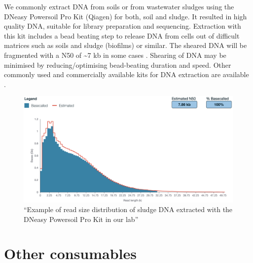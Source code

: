 \documentclass[
]{book}
\begin{document}
We commonly extract DNA from soils or from wastewater sludges using the DNeasy Powersoil Pro Kit (Qiagen) for both, soil and sludge. It resulted in high quality DNA, suitable for library preparation and sequencing. Extraction with this kit includes a bead beating step to release DNA from cells out of difficult matrices such as soils and sludge (biofilms) or similar. The sheared DNA will be fragmented with a N50 of \textasciitilde7 kb in some cases \citep{Jensen2024}. Shearing of DNA may be minimised by reducing/optimising bead-beating duration and speed. Other commonly used and commercially available kits for DNA extraction are available \citep{Jensen2024, Gand2023}.

\begin{figure}
\centering
\includegraphics[width=6.25in,height=\textheight]{./img/readsize.png}
\caption{``Example of read size distribution of sludge DNA extracted with the DNeasy Powersoil Pro Kit in our lab''}
\end{figure}

\section{Other consumables}\label{other-consumables}
\end{document}
